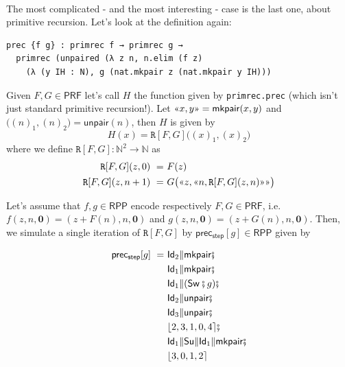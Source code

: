 \documentclass[oneside]{book}
\theoremstyle{definition}
\theoremstyle{remark}
\theoremstyle{plain}
\newcommand{\NN}{\mathbb{N}}
\newcommand{\gl}{\text{\guillemotleft}}
\newcommand{\gr}{\text{\guillemotright}}
\newcommand{\RPP}{\mathsf{RPP}}
\newcommand{\rppId}{\mathsf{Id}}
\newcommand{\rppSu}{\mathsf{Su}}
\newcommand{\rppSw}{\mathsf{Sw}}
\newcommand{\rppCo}{\fatsemi}
\newcommand{\rppPa}{\Vert}
\newcommand{\rpprewire}[1]{\lfloor #1 \rceil}
\newcommand{\rppmkpair}{\mathsf{mkpair}}
\newcommand{\rppunpair}{\mathsf{unpair}}
\newcommand{\rppprecstep}{\mathsf{prec_{step}}}
\newcommand{\PRF}{\mathsf{PRF}}
\newcommand{\prPrec}{\mathtt{R}}
\begin{document}
\paragraph{}

The most complicated - and the most interesting - case is the last one,
about primitive recursion.
Let's look at the definition again:
\begin{lstlisting}
prec {f g} : primrec f → primrec g →
  primrec (unpaired (λ z n, n.elim (f z)
    (λ (y IH : N), g (nat.mkpair z (nat.mkpair y IH)))
\end{lstlisting}
Given $F, G \in \PRF$ let's call $H$ the function given by \lstinline{primrec.prec}
(which isn't just standard primitive recursion!).
Let $\gl x, y \gr = \rppmkpair(x,y)$ and $\big( (n)_1, (n)_2 \big) = \rppunpair(n)$,
then $H$ is given by
\[ H(x) = \prPrec[F,G]\big( (x)_1, (x)_2 \big) \]
where we define $\prPrec[F,G] : \NN^2 \to \NN$ as
\begin{align*}
  \prPrec[F,G](z,0) \ = \ & F(z) \\
  \prPrec[F,G](z, n+1) \ = \ & G \big( \gl z, \gl n, \prPrec[F,G](z,n) \gr \gr \big)
\end{align*}

Let's assume that $f, g \in \RPP$ encode respectively $F, G \in \PRF$, i.e.
$f(z, n, \boldsymbol{0}) = (z+F(n), n, \boldsymbol{0})$ and $g(z, n, \boldsymbol{0}) = (z+G(n), n, \boldsymbol{0})$.
Then, we simulate a single iteration of $\prPrec[F,G]$ by $\rppprecstep[g] \in \RPP$ given by

\begin{align*}
\rppprecstep[g] \ = \ & \rppId_2 \rppPa \rppmkpair \rppCo                               \\
                      & \rppId_1 \rppPa \rppmkpair \rppCo                               \\
                      & \rppId_1 \rppPa (\rppSw \rppCo g) \rppCo                        \\
                      & \rppId_2 \rppPa \rppunpair \rppCo                               \\
                      & \rppId_3 \rppPa \rppunpair \rppCo                               \\
                      & \rpprewire{2, 3, 1, 0, 4} \rppCo                                \\
                      & \rppId_1 \rppPa \rppSu \rppPa \rppId_1 \rppPa \rppmkpair \rppCo \\
                      & \rpprewire{3, 0, 1, 2}                                          \\
\end{align*}
\end{document}
